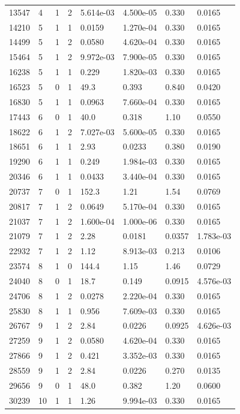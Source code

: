 \documentclass[preview]{standalone}
\begin{document}
{{\begin{tabular}{L{1.2cm}C{1.2cm} C{0.3cm}C{0.5cm} C{1.4cm}C{1.4cm} C{1.4cm}C{1.4cm}}
  13547  &     4  & 1     &  2 &  5.614e-03  & 4.500e-05  & 0.330 &  0.0165   \\ 
  14210  &     5  & 1     &  1 &  0.0159  & 1.270e-04  & 0.330 &  0.0165   \\ 
  14499  &     5  & 1     &  2 &  0.0580  & 4.620e-04  & 0.330 &  0.0165   \\ 
  15464  &     5  & 1     &  2 &  9.972e-03  & 7.900e-05  & 0.330 &  0.0165   \\ 
  16238  &     5  & 1     &  1 &  0.229  & 1.820e-03  & 0.330 &  0.0165   \\ 
  16523  &     5  & 0     &  1 &  49.3  & 0.393  & 0.840 &  0.0420   \\ 
  16830  &     5  & 1     &  1 &  0.0963  & 7.660e-04  & 0.330 &  0.0165   \\ 
  17443  &     6  & 0     &  1 &  40.0  & 0.318  & 1.10 &  0.0550   \\ 
  18622  &     6  & 1     &  2 &  7.027e-03  & 5.600e-05  & 0.330 &  0.0165   \\ 
  18651  &     6  & 1     &  1 &  2.93  & 0.0233  & 0.380 &  0.0190   \\ 
  19290  &     6  & 1     &  1 &  0.249  & 1.984e-03  & 0.330 &  0.0165   \\ 
  20346  &     6  & 1     &  1 &  0.0433  & 3.440e-04  & 0.330 &  0.0165   \\ 
  20737  &     7  & 0     &  1 &  152.3  & 1.21  & 1.54 &  0.0769   \\ 
  20817  &     7  & 1     &  2 &  0.0649  & 5.170e-04  & 0.330 &  0.0165   \\ 
  21037  &     7  & 1     &  2 &  1.600e-04  & 1.000e-06  & 0.330 &  0.0165   \\ 
  21079  &     7  & 1     &  2 &  2.28  & 0.0181  & 0.0357 &  1.783e-03   \\ 
  22932  &     7  & 1     &  2 &  1.12  & 8.913e-03  & 0.213 &  0.0106   \\ 
  23574  &     8  & 1     &  0 &  144.4  & 1.15  & 1.46 &  0.0729   \\ 
  24040  &     8  & 0     &  1 &  18.7  & 0.149  & 0.0915 &  4.576e-03   \\ 
  24706  &     8  & 1     &  2 &  0.0278  & 2.220e-04  & 0.330 &  0.0165   \\ 
  25830  &     8  & 1     &  1 &  0.956  & 7.609e-03  & 0.330 &  0.0165   \\ 
  26767  &     9  & 1     &  2 &  2.84  & 0.0226  & 0.0925 &  4.626e-03   \\ 
  27259  &     9  & 1     &  2 &  0.0580  & 4.620e-04  & 0.330 &  0.0165   \\ 
  27866  &     9  & 1     &  2 &  0.421  & 3.352e-03  & 0.330 &  0.0165   \\ 
  28559  &     9  & 1     &  2 &  2.84  & 0.0226  & 0.270 &  0.0135   \\ 
  29656  &     9  & 0     &  1 &  48.0  & 0.382  & 1.20 &  0.0600   \\ 
  30239  &    10  & 1     &  1 &  1.26  & 9.994e-03  & 0.330 &  0.0165   \\ 
\hline 
\end{tabular} 

}}
\end{document}

